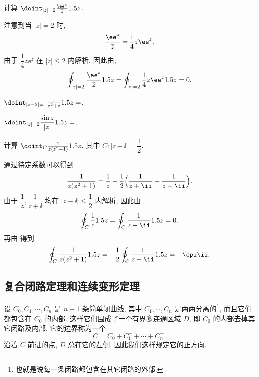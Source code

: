 \begin{example}
  计算 $\doint_{|z|=2}\frac{\ee^z}{~\ov z~}\d z$.
\end{example}

\begin{solution}
  注意到当 $|z|=2$ 时,
  \[
    \frac{\ee^z}{~\ov z~}=\frac14{z\ee^z}.
  \]
  由于 $\dfrac14z\ee^z$ 在 $|z|\le 2$ 内解析,
  因此由\thmCG,
  \[
     \oint_{|z|=2}\frac{\ee^z}{~\ov z~}\d z
    =\oint_{|z|=2}\frac14z\ee^z\d z=0.
  \]
\end{solution}

\begin{exercise}\delspace
  \begin{enuminline}[(i)]
    \item $\doint_{|z-2|=1}\frac1{z^2+z}\d z=$\fillblank{}.
    \item $\doint_{|z|=2}\dfrac{\sin z}{|z|}\d z=$\fillblank{}.
  \end{enuminline}
\end{exercise}

\begin{example}
  计算 $\doint_C\frac1{z(z^2+1)}\d z$, 其中 $C:|z-\ii|=\dfrac12$.
\end{example}

\begin{solution}
  通过待定系数可以得到
  \[
     \dfrac1{z(z^2+1)}
    =\dfrac1z-\dfrac12\Bigl(\dfrac1{z+\ii}+\dfrac1{z-\ii }\Bigr).
  \]
  由于 $\dfrac1z,\dfrac1{z+\ii}$ 均在 $|z-\ii |\le\dfrac12$ 内解析, 因此由\thmCG
  \[
    \oint_C\frac1z\d z
    =\oint_C\frac1{z+\ii}\d z=0.
  \]
  再由 得到
  \[
    \oint_C\frac1{z(z^2+1)}\d z
    =-\half\oint_C\frac1{z-\ii }\d z=-\cpi\ii .
  \]
\end{solution}


\subsection{复合闭路定理和连续变形定理}

设 $C_0,C_1,\cdots,C_n$ 是 $n+1$ 条简单闭曲线, 其中 $C_1,\cdots,C_n$ 是两两分离的\footnote{也就是说每一条闭路都包含在其它闭路的外部.}, 而且它们都包含在 $C_0$ 的内部.
这样它们围成了一个有界多连通区域 $D$, 即 $C_0$ 的内部去掉其它闭路及内部.
它的边界称为一个
\[
  C=C_0+C_1^-+\cdots+C_n^-.
\]
沿着 $C$ 前进的点, $D$ 总在它的左侧, 因此我们这样规定它的正方向.

